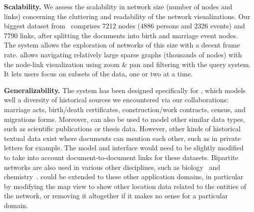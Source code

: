\noindent\textbf{Scalability.} We assess the scalability in network size (number of nodes and links) concerning the cluttering and readability of the network visualizations. Our biggest dataset from \zacarias\ comprises 7212 nodes (4886 persons and 2326 events) and 7790 links, after splitting the documents into birth and marriage event nodes. The system allows the exploration of networks of this size with a decent frame rate.
\name allows navigating relatively large sparse graphs (thousands of nodes) with the node-link visualization using zoom \& pan and filtering with the query system. It lets users focus on subsets of the data, one or two at a time.

\noindent\textbf{Generalizability.} The system has been designed specifically for \modelplural, which models well a diversity of historical sources we encountered via our collaborations: marriage acts, birth/death certificates, construction/work contracts, census, and migrations forms.
Moreover, \model can also be used to model other similar data types, such as scientific publications or thesis data.
However, other kinds of historical textual data exist where documents can mention each other, such as in private letters for example.
The model and interface would need to be slightly modified to take into account document-to-document links for these datasets.
Bipartite networks are also used in various other disciplines, such as biology~\cite{klamt2009hypergraphs} and chemistry~\cite{konstantinovaApplicationHypergraphTheory2001}. \name could be extended to these other application domains, in particular by modifying the map view to show other location data related to the entities of the network, or removing it altogether if it makes no sense for a particular domain.



